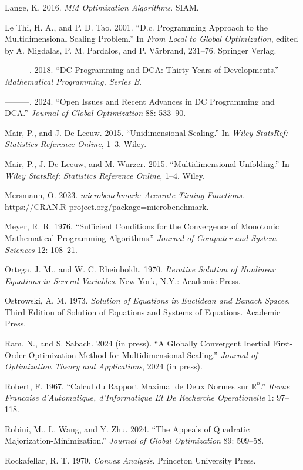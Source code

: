 \documentclass[
  12pt,
]{article}
\newlength{\cslhangindent}
\newenvironment{CSLReferences}[2] %
 {\begin{list}{}{%
  \setlength{\itemindent}{0pt}
  \setlength{\leftmargin}{0pt}
  \setlength{\parsep}{0pt}
  \ifodd #1
   \setlength{\leftmargin}{\cslhangindent}
   \setlength{\itemindent}{-1\cslhangindent}
  \fi
  \setlength{\itemsep}{#2\baselineskip}}}
 {\end{list}}
\begin{document}
\begin{CSLReferences}{1}{0}
Lange, K. 2016. \emph{MM Optimization Algorithms}. SIAM.

Le Thi, H. A., and P. D. Tao. 2001. {``D.c. Programming Approach to the Multidimensional Scaling Problem.''} In \emph{From Local to Global Optimization}, edited by A. Migdalas, P. M. Pardalos, and P. Värbrand, 231--76. Springer Verlag.

---------. 2018. {``{DC Programming and DCA: Thirty Years of Developments}.''} \emph{Mathematical Programming, Series B}.

---------. 2024. {``Open Issues and Recent Advances in DC Programming and DCA.''} \emph{Journal of Global Optimization} 88: 533--90.

Mair, P., and J. De Leeuw. 2015. {``{Unidimensional Scaling}.''} In \emph{Wiley {StatsRef}: Statistics Reference Online}, 1--3. Wiley.

Mair, P., J. De Leeuw, and M. Wurzer. 2015. {``{Multidimensional Unfolding}.''} In \emph{Wiley {StatsRef}: Statistics Reference Online}, 1--4. Wiley.

Mersmann, O. 2023. \emph{{microbenchmark: Accurate Timing Functions}}. \url{https://CRAN.R-project.org/package=microbenchmark}.

Meyer, R. R. 1976. {``{Sufficient Conditions for the Convergence of Monotonic Mathematical Programming Algorithms}.''} \emph{Journal of Computer and System Sciences} 12: 108--21.

Ortega, J. M., and W. C. Rheinboldt. 1970. \emph{{Iterative Solution of Nonlinear Equations in Several Variables}}. New York, N.Y.: Academic Press.

Ostrowski, A. M. 1973. \emph{Solution of Equations in Euclidean and Banach Spaces}. Third Edition of Solution of Equations and Systems of Equations. Academic Press.

Ram, N., and S. Sabach. 2024 (in press). {``A Globally Convergent Inertial First-Order Optimization Method for Multidimensional Scaling.''} \emph{Journal of Optimization Theory and Applications}, 2024 (in press).

Robert, F. 1967. {``{Calcul du Rapport Maximal de Deux Normes sur \(\mathbb{R}^n\)}.''} \emph{Revue Francaise d'Automatique, d'Informatique Et De Recherche Operationelle} 1: 97--118.

Robini, M., L. Wang, and Y. Zhu. 2024. {``The Appeals of Quadratic Majorization-Minimization.''} \emph{Journal of Global Optimization} 89: 509--58.

Rockafellar, R. T. 1970. \emph{Convex Analysis}. Princeton University Press.

\end{CSLReferences}
\end{document}

